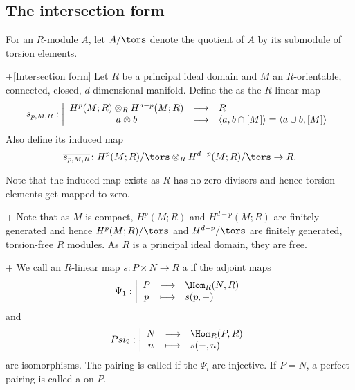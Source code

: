 \subsection{The intersection form}

\begin{notation}
  For an $R$-module  $A$, let  $A/\tors$ denote the quotient
  of $A$ by its submodule of torsion elements.
\end{notation}

\begin{definition}+[Intersection form]
  \label{def:intersection-form}
  Let $R$ be a  principal ideal domain and $M$ an  $R$-orientable,
  connected, closed,  $d$-dimensional manifold. 
  Define the  as the $R$-linear map 
    \begin{equation*}
    s_{p,M,R}: \left| \begin{array}{c c l} 
    H^p(M;R) \otimes _R H^{d-p}(M;R) & \longrightarrow & R \\
    a \otimes b& \longmapsto &  \left< a, b \cap [M] \right>
    = \left< a\cup b, [M] \right> 
    \end{array} \right.
  \end{equation*}
  Also define its induced map
  \[
    \overline{s_{p,M,R}}\colon  H^p(M;R)/\tors \otimes _R H^{d-p}(M;R)/\tors
    \to 
    R
  .\] 
\end{definition}
\begin{well-definedness}
  Note that the induced map exists as $R$ has no zero-divisors
  and hence torsion elements get mapped to zero.
\end{well-definedness}

\begin{remark}+
  Note that as $M$ is compact,  $H^p(M;R)$ and  $H^{d-p}(M;R)$ 
  are finitely generated and hence $H^p(M;R) / \tors$ and
  $H^{d-p} / \tors$ are finitely generated, torsion-free $R$ modules.
  As  $R$ is a  principal ideal domain, they are free.
\end{remark}

\begin{definition}+
  We call an $R$-linear map  $s\colon P\times N \to R$ a 
  if the adjoint maps
    \begin{equation*}
    \Psi _1: \left| \begin{array}{c c l} 
    P & \longrightarrow & \Hom_R(N,R) \\
    p & \longmapsto &  s(p,\dash)
    \end{array} \right.
  \end{equation*}
  and
    \begin{equation*}
    Psi_2: \left| \begin{array}{c c l} 
    N & \longrightarrow & \Hom_R(P,R) \\
    n & \longmapsto &  s(\dash,n)
    \end{array} \right.
  \end{equation*}
  are isomorphisms.
  The pairing is called  if the $\Psi_i$ are injective.
  If  $P=N$, a perfect pairing is called a  on $P$.
\end{definition}

